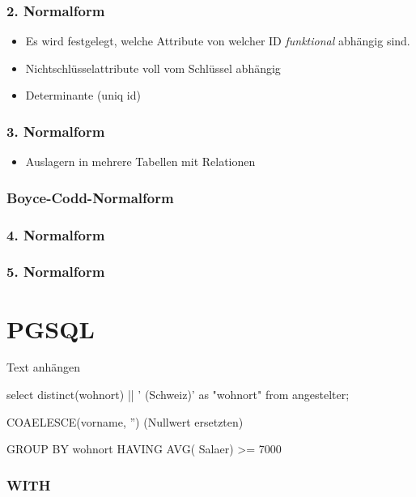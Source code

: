 \begin{multicols}{2}
\subsubsection{2. Normalform}

	\begin{itemize}
		\item Es wird festgelegt, welche Attribute von welcher ID \emph{funktional} abhängig sind.
		\item Nichtschlüsselattribute voll vom Schlüssel abhängig
		\item Determinante (uniq id)
	\end{itemize}

\subsubsection{3. Normalform}
	\begin{itemize}
		\item Auslagern in mehrere Tabellen mit Relationen
	\end{itemize}

\subsubsection{Boyce-Codd-Normalform}
\subsubsection{4. Normalform}
\subsubsection{5. Normalform}


\section{PGSQL}
	
	Text anhängen 
	
		select distinct(wohnort) || ' (Schweiz)' as "wohnort" from angestelter;
	
	COAELESCE(vorname, '') (Nullwert ersetzten)
	
	
	GROUP BY wohnort HAVING AVG( Salaer) >= 7000
	

\subsubsection{WITH}


\end{multicols}
